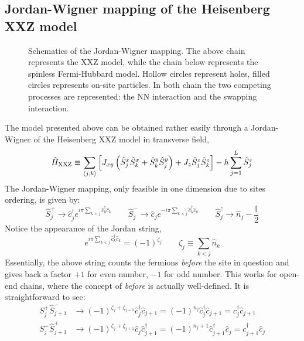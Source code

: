 \subsection{Jordan-Wigner mapping of the Heisenberg XXZ model}

\begin{figure}
	\centering
	
	\caption{Schematics of the Jordan-Wigner mapping. The above chain represents the $\mathrm{XXZ}$ model, while the chain below represents the spinless Fermi-Hubbard model. Hollow circles represent holes, filled circles represents on-site particles. In both chain the two competing processes are represented: the NN interaction and the swapping interaction.}
	\label{fig:jordan-wigner-mapping}
\end{figure}

The model presented above can be obtained rather easily through a Jordan-Wigner of the Heisenberg XXZ model in transverse field,
\begin{equation}\label{eq:xxz-hamiltonian}
	\hat H_\mathrm{XXZ} \equiv \sum_{\ev{j,k}} \left[
		J_{xy} \left( 
			\hat S_j^x \hat S_k^x + \hat S_k^y \hat S_j^y
		\right) + J_z \hat S_j^z \hat S_k^z
	\right] - h \sum_{j=1}^L \hat S_j^z 
\end{equation}
The Jordan-Wigner mapping, only feasible in one dimension due to sites ordering, is given by:
\[
	\hat S_j^+ \to \hat c_j^\dagger e^{i\pi \sum_{k < j} \hat c_k^\dagger \hat c_k}
	\qquad
	\hat S_j^- \to \hat c_j e^{- i\pi \sum_{k < j} \hat c_k^\dagger \hat c_k}
	\qquad
	\hat S_j^z \to \hat n_j - \frac{\mathbb{I}}{2}
\]
Notice the appearance of the Jordan string,
\[
	e^{i\pi \sum_{k < j} \hat c_k^\dagger \hat c_k} = (-1)^{\zeta_j}
	\qquad
	\zeta_j \equiv \sum_{k < j} \hat n_k
\]
Essentially, the above string counts the fermions \textit{before} the site in question and gives back a factor $+1$ for even number, $-1$ for odd number. This works for open-end chains, where the concept of \textit{before} is actually well-defined. It is straightforward to see:
\[
	\begin{aligned}
		S_j^+ \hat S_{j+1}^- &\to (-1)^{\zeta_j + \zeta_{j+1}} \hat c_j^\dagger \hat c_{j+1} = (-1)^{n_j} \hat c_j^\dagger \hat c_{j+1} = c_j^\dagger \hat c_{j+1} \\
		S_j^- \hat S_{j+1}^+ &\to (-1)^{\zeta_j + \zeta_{j+1}} \hat c_j \hat c_{j+1}^\dagger = (-1)^{n_j+1} \hat c_{j+1}^\dagger \hat c_j = c_{j+1}^\dagger \hat c_j \\
	\end{aligned}
\]
